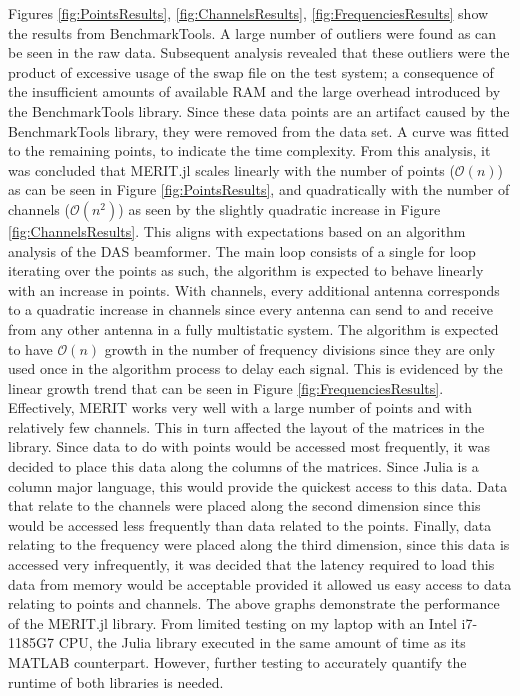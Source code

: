 Figures \ref{fig:PointsResults}, \ref{fig:ChannelsResults}, \ref{fig:FrequenciesResults} show the results from
BenchmarkTools. A large number of outliers were found as can be seen in the raw data. Subsequent analysis revealed that
these outliers were the product of excessive usage of the swap file on the test system; a consequence of the
insufficient amounts of available RAM and the large overhead introduced by the BenchmarkTools library. Since these data
points are an artifact caused by the BenchmarkTools library, they were removed from the data set. A curve was fitted to
the remaining points, to indicate the time complexity. From this analysis, it was concluded that MERIT.jl scales
linearly with the number of points ($\mathcal{O}(n)$) as can be seen in Figure \ref{fig:PointsResults}, and
quadratically with the number of channels ($\mathcal{O}(n^2)$) as seen by the slightly quadratic increase in Figure
\ref{fig:ChannelsResults}. This aligns with expectations based on an algorithm analysis of the DAS beamformer. The main
loop consists of a single for loop iterating over the points as such, the algorithm is expected to behave linearly with
an increase in points. With channels, every additional antenna corresponds to a quadratic increase in channels since
every antenna can send to and receive from any other antenna in a fully multistatic system. The algorithm is expected to
have $\mathcal{O}(n)$ growth in the number of frequency divisions since they are only used once in the algorithm process
to delay each signal. This is evidenced by the linear growth trend that can be seen in Figure
\ref{fig:FrequenciesResults}. Effectively, MERIT works very well with a large number of points and with relatively few
channels. This in turn affected the layout of the matrices in the library. Since data to do with points would be
accessed most frequently, it was decided to place this data along the columns of the matrices. Since Julia is a column
major language, this would provide the quickest access to this data. Data that relate to the channels were placed along
the second dimension since this would be accessed less frequently than data related to the points. Finally, data
relating to the frequency were placed along the third dimension, since this data is accessed very infrequently, it was
decided that the latency required to load this data from memory would be acceptable provided it allowed us easy access
to data relating to points and channels. The above graphs demonstrate the performance of the MERIT.jl library. From
limited testing on my laptop with an Intel i7-1185G7 CPU, the Julia library executed in the same amount of time as its
MATLAB counterpart. However, further testing to accurately quantify the runtime of both libraries is needed.

